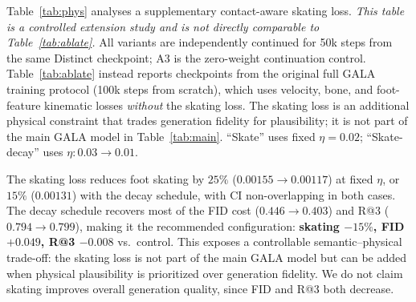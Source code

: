 \documentclass[journal]{IEEEtran}
\begin{document}
Table~\ref{tab:phys} analyses a supplementary contact-aware skating loss. \emph{This table is a controlled extension study and is not directly comparable to Table~\ref{tab:ablate}.} All variants are independently continued for 50k steps from the same Distinct checkpoint; A3 is the zero-weight continuation control. Table~\ref{tab:ablate} instead reports checkpoints from the original full GALA training protocol (100k steps from scratch), which uses velocity, bone, and foot-feature kinematic losses \emph{without} the skating loss. The skating loss is an additional physical constraint that trades generation fidelity for plausibility; it is not part of the main GALA model in Table~\ref{tab:main}. ``Skate'' uses fixed $\eta{=}0.02$; ``Skate-decay'' uses $\eta{:}0.03{\to}0.01$.

\begin{table}[t]
\centering
\caption{Contact-aware skating loss analysis on HumanML3D test (20 replications, 20 NFEs, CFG 2.5, 50k steps from Distinct). Not part of the main GALA model; exposes a controllable semantic--physical trade-off.}
\label{tab:phys}
\small
\setlength{\tabcolsep}{2.4pt}
\end{table}

The skating loss reduces foot skating by $25\%$ ($0.00155{\to}0.00117$) at fixed $\eta$, or $15\%$ ($0.00131$) with the decay schedule, with CI non-overlapping in both cases. The decay schedule recovers most of the FID cost ($0.446{\to}0.403$) and R@3 ($0.794{\to}0.799$), making it the recommended configuration: \textbf{skating $-15\%$, FID $+0.049$, R@3 $-0.008$} vs.\ control. This exposes a controllable semantic--physical trade-off: the skating loss is not part of the main GALA model but can be added when physical plausibility is prioritized over generation fidelity. We do not claim skating improves overall generation quality, since FID and R@3 both decrease.
\end{document}

